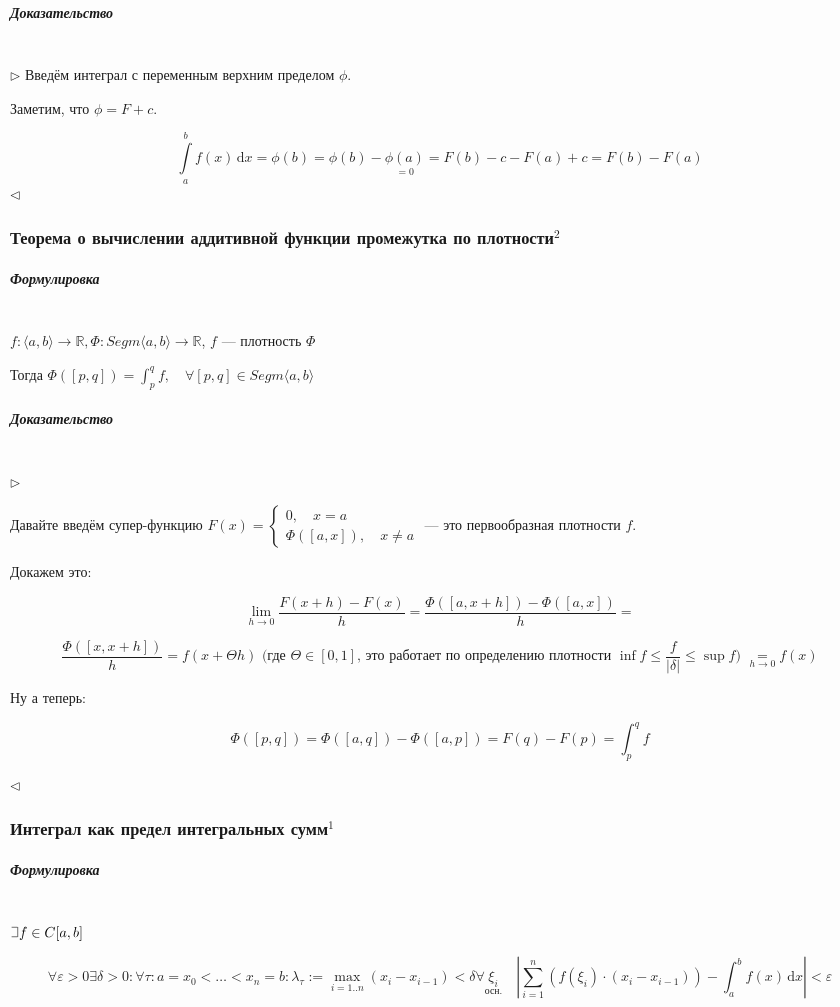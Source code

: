 \documentclass{article}
\def\letus{%
\mathord{\setbox0=\hbox{$\exists$}%
         \hbox{\kern 0.125\wd0%
               \vbox to \ht0{%
                  \hrule width 0.75\wd0%
                  \vfill%
                  \hrule width 0.75\wd0}%
               \vrule height \ht0%
               \kern 0.125\wd0}%
       }%
        }
\def\D{\,\mathrm{d}}
\let\vanillasubparagraph\subparagraph
\renewcommand{\subparagraph}[1]{\vanillasubparagraph{#1}\mbox{}\\}
\begin{document}
\subparagraph{Доказательство}
$\rhd$
Введём интеграл с переменным верхним пределом $\phi$.

Заметим, что $\phi = F + c$.

$$
\int\limits_a^b f(x)\D x = \phi(b) = \phi(b) - \underset{=0}{\phi(a)} = F(b) - c - F(a) + c = F(b) - F(a)
$$
$\lhd$

\subsubsection{Теорема о вычислении аддитивной функции промежутка по плотности\texorpdfstring{$^2$}{}}

\subparagraph{Формулировка}

$f: \langle a, b \rangle \rightarrow \mathbb{R},  \Phi: Segm\langle a, b\rangle \rightarrow \mathbb{R}$, $f$ --- плотность $\Phi$

Тогда $\Phi\left([p, q]\right) = \int_p^q f,\quad \forall [p, q] \in Segm\langle a, b\rangle$

\subparagraph{Доказательство}

$\rhd$

Давайте введём супер-функцию $F(x) = \begin{cases}
0, \quad x = a \\
\Phi([a, x]), \quad x \neq a
\end{cases}$ --- это первообразная плотности $f$.

Докажем это:

\[\lim_{h \rightarrow 0}{\frac{F(x + h) - F(x)}{h}} = \frac{\Phi([a, x + h]) - \Phi([a, x])}{h} =\]

\[\frac{\Phi([x, x + h])}{h} = f(x + \Theta h) \text{  (где $\Theta \in [0, 1]$, это работает по определению плотности $\inf f \le \frac{f}{|\delta|} \le \sup f$)  } \underset{h \rightarrow 0}{=}  f(x)\]

Ну а теперь:

\[\Phi([p, q]) = \Phi([a, q]) - \Phi([a, p]) = F(q) - F(p) = \int_p^q{f} \]

$\lhd$


\subsubsection{Интеграл как предел интегральных сумм\texorpdfstring{$^1$}{}}
\subparagraph{Формулировка}
$\letus f\in C[a, b]$

$$
\forall \varepsilon > 0 \exists \delta > 0 : \forall \tau: a = x_0 < \ldots < x_n = b : \lambda_\tau := \max_{i=1..n}(x_i - x_{i-1}) < \delta \forall \underset{\text{осн.}}{\xi_i} \quad \left|\sum_{i=1}^n (f(\xi_i) \cdot (x_i - x_{i-1})) - \int_a^b f(x) \D x\right| < \varepsilon
$$
\end{document}
